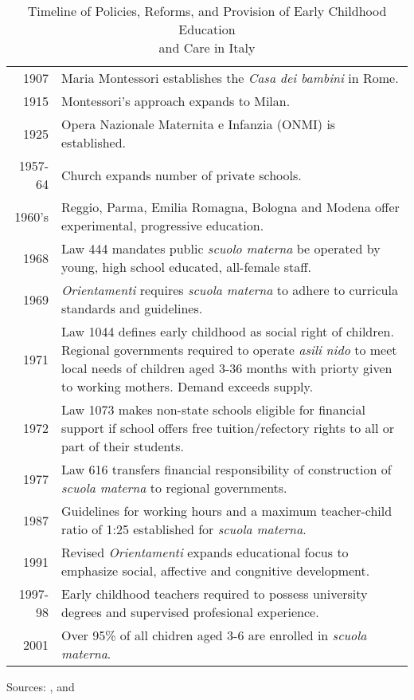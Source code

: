\documentclass{article}
\newcommand{\foo}{\hspace{-2.3pt}$\bullet$ \hspace{5pt}}
\theoremstyle{definition}
\theoremstyle{remark}
\begin{document}
\begin{table}
\begin{center}
\begin{threeparttable}
\caption{Timeline of Policies, Reforms, and Provision of Early Childhood Education \\ and Care in Italy}
\label{tbl:1}
\def\arraystretch{2}
\begin{tabular}{r |@{\foo} p{10cm}}
\toprule
  1907 & Maria Montessori establishes the \textit{Casa dei bambini} in Rome.\\
  1915 & Montessori's approach expands to Milan. \\
  1925 & Opera Nazionale Maternita e Infanzia (ONMI) is established. \\
  1957-64 & Church expands number of private schools. \\
  1960's & Reggio,  Parma, Emilia Romagna, Bologna and Modena offer experimental, progressive education. \\
  1968 &  Law 444  mandates public \textit{scuolo materna} be operated by young, high school educated, all-female staff.\\
  1969 & \textit{Orientamenti} requires \textit{scuola materna} to adhere to curricula standards and guidelines. \\
  1971 & Law 1044 defines early childhood as social right of children. Regional governments  required to operate \textit{asili nido} to meet local needs of children aged 3-36 months with priorty given to working mothers. Demand exceeds supply. \\
  1972  & Law 1073 makes non-state schools eligible for financial support if school offers free tuition/refectory rights to all or part of their students. \\
  1977 & Law 616 transfers financial responsibility of construction of \textit{scuola materna} to regional governments. \\
  1987 & Guidelines for working hours and a maximum teacher-child ratio of 1:25 established for \textit{scuola materna}. \\
  1991 & Revised \textit{Orientamenti} expands educational focus to emphasize social, affective and congnitive development.\\
  1997-98 & Early childhood teachers required to possess university degrees and supervised profesional experience. \\
  2001 & Over 95\% of all chidren aged 3-6 are enrolled in \textit{scuola materna}. \\
\bottomrule
\end{tabular}
\begin{tablenotes}
\small
\item Sources: \citet{Corsaro_1996_Early-Edu}, \citet{OECD_2001_Italy-Country-Note} and \citet{Saraceno_1984_Soc-Probs}
\end{tablenotes}
\end{threeparttable}
\end{center}
\end{table}
\end{document}
